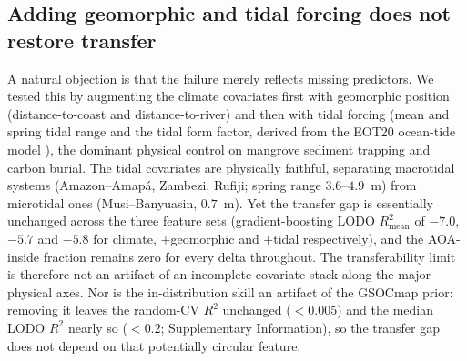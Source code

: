 \documentclass[11pt]{article}
\begin{document}
\subsection{Adding geomorphic and tidal forcing does not restore transfer}
A natural objection is that the failure merely reflects missing predictors. We tested
this by augmenting the climate covariates first with geomorphic position
(distance-to-coast and distance-to-river) and then with tidal forcing (mean and spring
tidal range and the tidal form factor, derived from the EOT20 ocean-tide model
\citep{hartdavis2021eot20}), the dominant physical control on mangrove sediment
trapping and carbon burial. The tidal covariates are physically faithful, separating
macrotidal systems (Amazon--Amap\'a, Zambezi, Rufiji; spring range $3.6$--$4.9$~m) from
microtidal ones (Musi--Banyuasin, $0.7$~m). Yet the transfer gap is essentially
unchanged across the three feature sets (gradient-boosting LODO $R^2_{\text{mean}}$ of
$-7.0$, $-5.7$ and $-5.8$ for climate, $+$geomorphic and $+$tidal respectively), and
the AOA-inside fraction remains zero for every delta throughout. The transferability
limit is therefore not an artifact of an incomplete covariate stack along the major
physical axes. Nor is the in-distribution skill an artifact of the GSOCmap prior:
removing it leaves the random-CV $R^2$ unchanged ($<0.005$) and the median LODO $R^2$
nearly so ($<0.2$; Supplementary Information), so the transfer gap does not depend on
that potentially circular feature.
\end{document}
